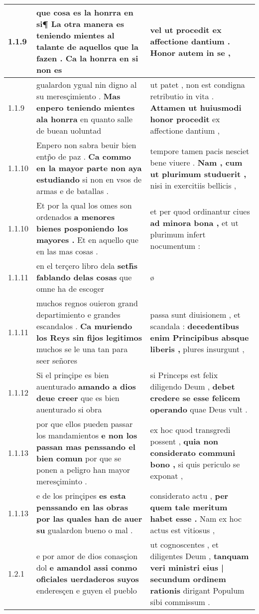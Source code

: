 \begin{tabular}{|p{1cm}|p{6.5cm}|p{6.5cm}|}
1.1.9 & que cosa es la honrra en si¶ \textbf{ La otra manera es teniendo mientes al talante de aquellos que la fazen . } Ca la honrra en si non es & vel ut procedit \textbf{ ex affectione dantium . } Honor autem in se , \\\hline
1.1.9 & gualardon ygual nin digno al su meresçimiento . \textbf{ Mas enpero teniendo mientes ala honrra } en quanto salle de buean uoluntad & ut patet , non est condigna retributio in vita . \textbf{ Attamen ut huiusmodi honor procedit } ex affectione dantium , \\\hline
1.1.10 & Enpero non sabra beuir bien entp̃o de paz . \textbf{ Ca commo en la mayor parte non aya estudiando } si non en vsos de armas e de batallas . & tempore tamen pacis nesciet bene viuere . \textbf{ Nam , cum ut plurimum studuerit , } nisi in exercitiis bellicis , \\\hline
1.1.10 & Et por la qual los omes son ordenados \textbf{ a menores bienes posponiendo los mayores . } Et en aquello que en las mas cosas . & et per quod ordinantur ciues \textbf{ ad minora bona , } et ut plurimum infert nocumentum : \\\hline
1.1.11 & en el terçero libro dela \textbf{ seth̃s fablando delas cosas } que omne ha de escoger & ø \\\hline
1.1.11 & muchos regnos ouieron grand departimiento e grandes escandalos . \textbf{ Ca muriendo los Reys sin fijos legitimos } muchos se le una tan para seer señores & passa sunt diuisionem , et scandala : \textbf{ decedentibus enim Principibus absque liberis , } plures insurgunt , \\\hline
1.1.12 & Si el prinçipe es bien auenturado \textbf{ amando a dios deue creer } que es bien auenturado si obra & si Princeps est felix diligendo Deum , \textbf{ debet credere se esse felicem operando } quae Deus vult . \\\hline
1.1.13 & por que ellos pueden passar los mandamientos \textbf{ e non los passan mas penssando el bien comun } por que se ponen a peligro han mayor meresçiminto . & ex hoc quod transgredi possent , \textbf{ quia non considerato communi bono , } si quis periculo se exponat , \\\hline
1.1.13 & e de los prinçipes \textbf{ es esta penssando en las obras por las quales han de auer su } gualardon bueno o mal . & considerato actu , \textbf{ per quem tale meritum habet esse . } Nam ex hoc actus est vitiosus , \\\hline
1.2.1 & e por amor de dios conasçion dol \textbf{ e amandol assi conmo oficiales uerdaderos suyos } enderesçen e guyen el pueblo & ut cognoscentes , et diligentes Deum , \textbf{ tanquam veri ministri eius | secundum ordinem rationis } dirigant Populum sibi commissum . \\\hline

\end{tabular}

